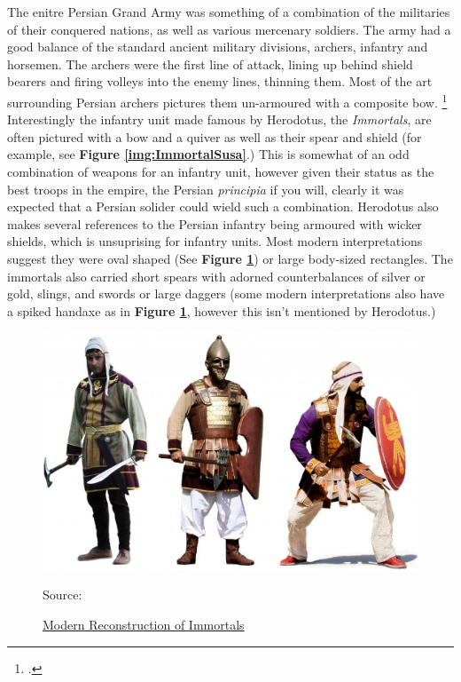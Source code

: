 \documentclass[twoside, a4paper, 12pt]{article}
\newcommand{\sourceR}[1]{\caption*{\hfill Source: {#1}} }
\begin{document}
\par\vspace{1em}

The enitre Persian Grand Army was something of a combination of the militaries
of their conquered nations, as well as various mercenary soldiers. The army had
a good balance of the standard ancient military divisions, archers, infantry
and horsemen. The archers were the first line of attack, lining up behind
shield bearers and firing volleys into the enemy lines, thinning them. Most
of the art surrounding Persian archers pictures them un-armoured with a composite
bow. \footcite{dhwty_2015}
Interestingly the infantry unit made famous by Herodotus, the \emph{Immortals},
are often pictured with a bow and a quiver as well as their spear and shield
(for example, see \textbf{Figure \ref{img:ImmortalSusa}}.)
This is somewhat of an odd combination of weapons for an infantry unit,
however given their status as the best troops in the empire, the Persian
\emph{principia} if you will, clearly it was expected that a Persian solider
could wield such a combination. Herodotus also makes several references to
the Persian infantry being armoured with wicker shields, which is unsuprising
for infantry units. Most modern interpretations suggest they were oval shaped
(See \textbf{Figure \ref{img:ImmortalModern}}) or large body-sized rectangles.
The immortals also carried short spears with adorned counterbalances of silver
or gold, slings, and swords or large daggers (some modern interpretations also
have a spiked handaxe as in \textbf{Figure \ref{img:ImmortalModern}}, however
this isn't mentioned by Herodotus.)

\begin{figure}
  \centering
  \includegraphics[width=\linewidth]{ModernImmortalReco.jpg}
  \captionsetup{justification=raggedleft}
  \caption{\ul{Modern Reconstruction of Immortals}}
  \sourceR{\cite{farrokh_2013}}
  \label{img:ImmortalModern}
\end{figure}
\end{document}
